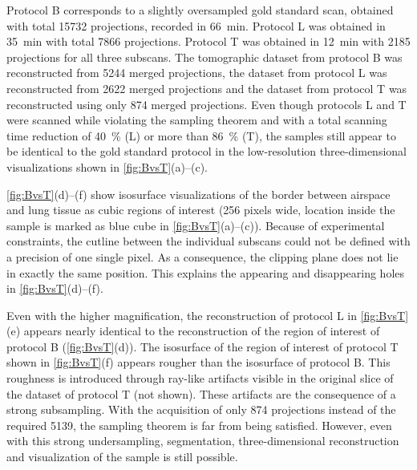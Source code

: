 Protocol B corresponds to a slightly oversampled gold standard scan, obtained with total 15732 projections, recorded in \SI{66}{\minute}. Protocol L was obtained in \SI{35}{\minute} with total 7866 projections. Protocol T was obtained in \SI{12}{\minute} with 2185 projections for all three subscans. The tomographic dataset from protocol B was reconstructed from 5244 merged projections, the dataset from protocol L was reconstructed from 2622 merged projections and the dataset from protocol T was reconstructed using only 874 merged projections. Even though protocols L and T were scanned while violating the sampling theorem and with a total scanning time reduction of \SI{40}{\percent} (L) or more than \SI{86}{\percent} (T), the samples still appear to be identical to the gold standard protocol in the low-resolution three-dimensional visualizations shown in \autoref{fig:BvsT}(a)--(c).

\autoref{fig:BvsT}(d)--(f) show isosurface visualizations of the border between airspace and lung tissue as cubic regions of interest (256 pixels wide, location inside the sample is marked as blue cube in \autoref{fig:BvsT}(a)--(c)). Because of experimental constraints, the cutline between the individual subscans could not be defined with a precision of one single pixel. As a consequence, the clipping plane does not lie in exactly the same position. This explains the appearing and disappearing holes in \autoref{fig:BvsT}(d)--(f).

Even with the higher magnification, the reconstruction of protocol L in \autoref{fig:BvsT}(e) appears nearly identical to the reconstruction of the region of interest of protocol B (\autoref{fig:BvsT}(d)). The isosurface of the region of interest of protocol T shown in \autoref{fig:BvsT}(f) appears rougher than the isosurface of protocol B. This roughness is introduced through ray-like artifacts visible in the original slice of the dataset of protocol T (not shown). These artifacts are the consequence of a strong subsampling. With the acquisition of only 874 projections instead of the required 5139, the sampling theorem is far from being satisfied. However, even with this strong undersampling, segmentation, three-dimensional reconstruction and visualization of the sample is still possible.

